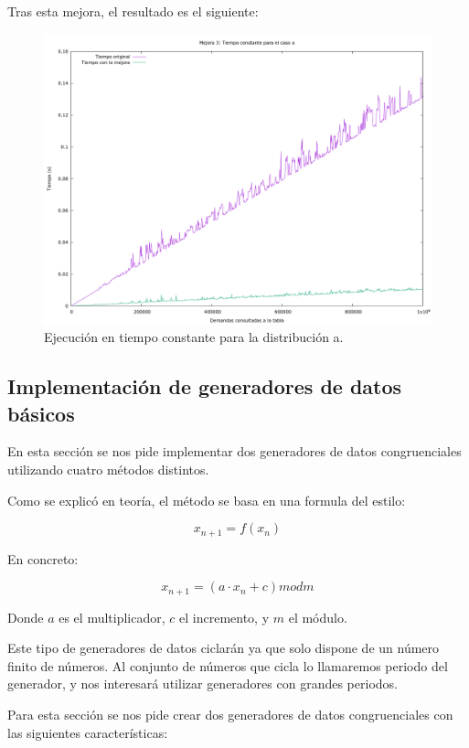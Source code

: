 \documentclass[12pt, spanish]{article}
\begin{document}
Tras esta mejora, el resultado es el siguiente:

\begin{figure}[H]
	\centering
	\includegraphics[scale = 0.2]{t_mejora3.png}
	\caption{Ejecución en tiempo constante para la distribución a.}
	\label{fig:ej1_a_150000}

\end{figure}



\newpage

\subsection{Implementación de generadores de datos básicos}

En esta sección se nos pide implementar dos generadores de datos congruenciales utilizando cuatro métodos distintos.

Como se explicó en teoría, el método se basa en una formula del estilo:

\[ x_{n+1} = f(x_{n}) \]

En concreto:

\[ x_{n+1} = (a \cdot x_{n} + c) mod m \]

Donde $a$ es el multiplicador, $c$ el incremento, y $m$ el módulo.

Este tipo de generadores de datos ciclarán ya que solo dispone de un número finito de números. Al conjunto de números que cicla lo llamaremos periodo del generador, y nos interesará utilizar generadores con grandes periodos.

Para esta sección se nos pide crear dos generadores de datos congruenciales con las siguientes características:
\end{document}
